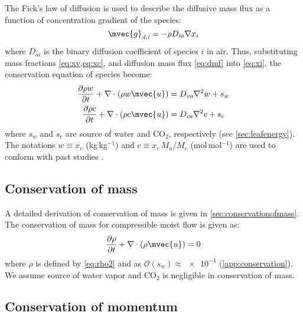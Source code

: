 The Fick's law of diffusion is used to describe the diffusive mass flux as a function of concentration gradient of the species:
\begin{equation}
\mvec{g}_{\textit{d,i}} = - \rho D_{\textit{ia}} \nabla x_i
\label{eq:dmf}
\end{equation}
where $D_{ai}$ is the binary diffusion coefficient of species $i$ in air. Thus, substituting mass fractions \cref{eq:xv,eq:xc}, and diffusion mass flux \cref{eq:dmf} into \cref{eq:xi}, the conservation equation of species become:
\begin{align}
\frac{\partial \rho w}{\partial t} + \nabla  \cdot \left( \rho w \mvec{u} \right) &= D_{\textit{va}} \nabla^2 w + s_w \label{eq:xv2}\\
\frac{\partial \rho c}{\partial t} + \nabla  \cdot \left( \rho c \mvec{u} \right) &= D_{\textit{ca}} \nabla^2 c + s_c \label{eq:xc2}
\end{align}
where $s_w$ and $s_c$ are source of water and CO$_2$, respectively (see \cref{sec:leafenergy}). The notations $w\equiv x_v$ (kg\,kg$^{-1}$) and $c\equiv x_c\, M_a/M_c $ (mol\,mol$^{-1}$) are used to conform with past studies \citep{Carmeliet2005, Defraeye2011, Saneinejad2013, Kubilay2014b}.

\subsection*{Conservation of mass}

A detailed derivation of conservation of mass is given in \cref{sec:conservationofmass}. The conservation of mass for compressible moist flow is given as:
\begin{equation}
\frac{\partial \rho}{\partial t} + \nabla \cdot \left( \rho \mvec{u} \right) = 0
\end{equation}
where $\rho$ is defined by \cref{eq:rho2} and as $\mathcal{O}(s_w)\approx \num{e-4}$ (\cref{app:conservation}). We assume source of water vapor and CO$_2$ is negligible in conservation of mass. 

\subsection*{Conservation of momentum}

